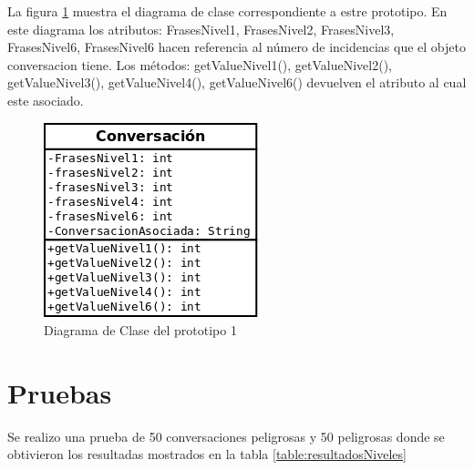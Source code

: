 La figura \ref{fig:diagramaDeClase} muestra el diagrama de clase correspondiente a estre prototipo. En este diagrama los atributos: FrasesNivel1, FrasesNivel2, FrasesNivel3, FrasesNivel6, FrasesNivel6 hacen referencia al n\'umero de incidencias que el objeto conversacion tiene. Los m\'etodos: getValueNivel1(), getValueNivel2(), getValueNivel3(), getValueNivel4(), getValueNivel6() devuelven el atributo al cual este asociado.
	\begin{figure}[h]
	\begin{center}
	\includegraphics[scale=.4]{images/claseprotipo2}
	\caption{Diagrama de Clase del prototipo 1}
	\label{fig:diagramaDeClase}
	\end{center}
	\end{figure}
\section{Pruebas}


Se realizo una prueba de 50 conversaciones peligrosas y 50 peligrosas donde se obtivieron los resultadas mostrados en la tabla \ref{table:resultadosNiveles}



